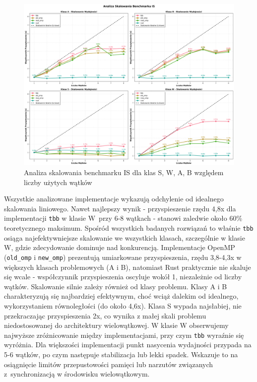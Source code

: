 \begin{figure}[H]
    \centering
    \includegraphics[width=\textwidth]{analiza/images/parallel/is/x86/is_analiza_skalowania.png}
    \caption{Analiza skalowania benchmarku IS dla klas S, W, A, B względem liczby użytych wątków}
    \label{is_analiza_skalowania_x86}
\end{figure}
Wszystkie analizowane implementacje wykazują odchylenie od idealnego skalowania liniowego. Nawet najlepszy wynik - przyspieszenie rzędu 4,8x dla implementacji \texttt{tbb} w klasie W~przy 6-8 wątkach - stanowi zaledwie około 60\% teoretycznego maksimum. Spośród wszystkich badanych rozwiązań to właśnie \texttt{tbb} osiąga najefektywniejsze skalowanie we wszystkich klasach, szczególnie w klasie W, gdzie zdecydowanie dominuje nad konkurencją. Implementacje OpenMP (\texttt{old\_omp} i \texttt{new\_omp}) prezentują umiarkowane przyspieszenia, rzędu 3,8-4,3x w większych klasach problemowych (A i B), natomiast Rust praktycznie nie skaluje się wcale - współczynnik przyspieszenia oscyluje wokół 1, niezależnie od liczby wątków. Skalowanie silnie zależy również od klasy problemu. Klasy A i B charakteryzują się najbardziej efektywnym, choć wciąż dalekim od idealnego, wykorzystaniem równoległości (do około 4,6x). Klasa S wypada najsłabiej, nie przekraczając przyspieszenia 2x, co wynika z małej skali problemu niedostosowanej do architektury wielowątkowej. W klasie W obserwujemy najwyższe zróżnicowanie między implementacjami, przy czym \texttt{tbb} wyraźnie się wyróżnia. Dla większości implementacji punkt nasycenia wydajności przypada na 5-6 wątków, po czym następuje stabilizacja lub lekki spadek. Wskazuje to na osiągnięcie limitów przepustowości pamięci lub narzutów związanych z~synchronizacją w środowisku wielowątkowym.

